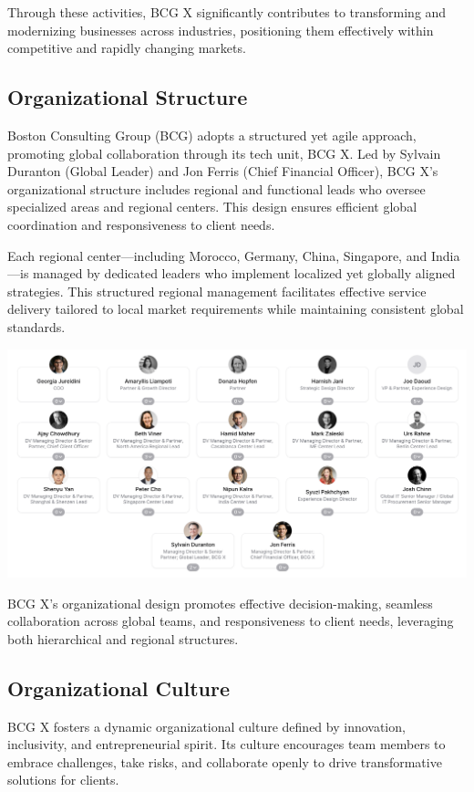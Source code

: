 Through these activities, BCG X significantly contributes to transforming and modernizing businesses across industries, positioning them effectively within competitive and rapidly changing markets.

\subsection{Organizational Structure}
Boston Consulting Group (BCG) adopts a structured yet agile approach, promoting global collaboration through its tech unit, BCG X. Led by Sylvain Duranton (Global Leader) and Jon Ferris (Chief Financial Officer), BCG X’s organizational structure includes regional and functional leads who oversee specialized areas and regional centers. This design ensures efficient global coordination and responsiveness to client needs.\mynewline

Each regional center—including Morocco, Germany, China, Singapore, and India—is managed by dedicated leaders who implement localized yet globally aligned strategies. This structured regional management facilitates effective service delivery tailored to local market requirements while maintaining consistent global standards.

\begin{center}
    \includegraphics[width=\linewidth]{Images/Executive Leadership Board.png}
    \cite{executive_leadership_board}
    \label{fig:executive_leadership_board}
\end{center}
\noindent
\mynewline
BCG X’s organizational design promotes effective decision-making, seamless collaboration across global teams, and responsiveness to client needs, leveraging both hierarchical and regional structures.

\subsection{Organizational Culture}
BCG X fosters a dynamic organizational culture defined by innovation, inclusivity, and entrepreneurial spirit. Its culture encourages team members to embrace challenges, take risks, and collaborate openly to drive transformative solutions for clients.\mynewline

